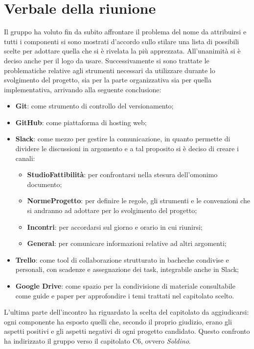 \section{Verbale della riunione}
Il gruppo ha voluto fin da subito affrontare il problema del nome da attribuirsi 
e tutti i componenti si sono mostrati d'accordo sullo stilare una lista di 
possibili scelte per adottare quella che si è rivelata la più apprezzata. 
All'unanimità si è deciso anche per il logo da usare. 
Successivamente si sono trattate le problematiche relative agli strumenti 
necessari da utilizzare durante lo svolgimento del progetto, sia per la parte 
organizzativa sia per quella implementativa, arrivando alla seguente 
conclusione:

\begin{itemize}
\item \textbf{Git}: come strumento di controllo del versionamento;
\item \textbf{GitHub}: come piattaforma di hosting web;
\item \textbf{Slack}: come mezzo per gestire la comunicazione, in quanto 
permette di dividere le discussioni in argomento e a tal proposito si è deciso 
di creare i canali:
	\begin{itemize}
		\item \textbf{StudioFattibilità}: per confrontarsi nella stesura dell'omonimo 
		documento;
		\item \textbf{NormeProgetto}: per definire le regole, gli strumenti e le 
		convenzioni che si andranno ad adottare per lo svolgimento del progetto;
		\item \textbf{Incontri}: per accordarsi sul giorno e orario in cui riunirsi;
		\item \textbf{General}: per comunicare informazioni relative ad altri 
		argomenti;
	\end{itemize}
\item \textbf{Trello}: come  tool di collaborazione strutturato in bacheche 
condivise e personali, con scadenze e assegnazione dei task, integrabile anche 
in Slack;
\item \textbf{Google Drive}: come spazio per la condivisione di materiale 
consultabile come guide e paper per approfondire i temi trattati nel capitolato 
scelto.
\end{itemize} 

\noindent L'ultima parte dell'incontro ha riguardato la scelta del capitolato da 
aggiudicarsi: ogni componente ha esposto quelli che, secondo il proprio 
giudizio, erano gli aspetti positivi e gli aspetti negativi di ogni progetto 
candidato. Questo confronto ha indirizzato il gruppo verso il capitolato C6,
ovvero \textit{Soldino}. 

